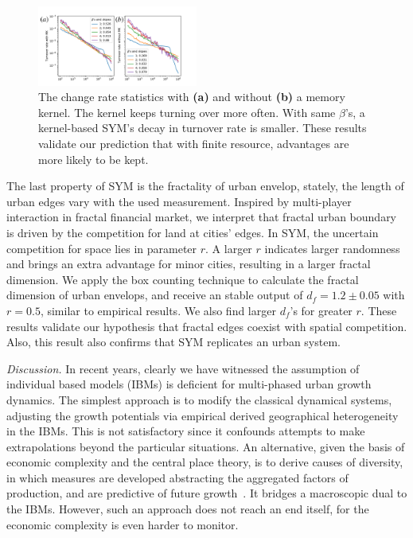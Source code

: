 \documentclass[reprint,unsortedaddress,amsmath,amssymb,aps,prl,showkeys]{revtex4-2}
\begin{document}
\begin{figure}
	\centering
	\includegraphics[width = 0.47\textwidth]{pics/turnoverrate.pdf}
	\caption{The change rate statistics with \textbf{(a)} and without \textbf{(b)} a memory kernel. The kernel keeps turning over more often. With same $\beta$'s, a kernel-based SYM's decay in turnover rate is smaller. These results validate our prediction that with finite resource, advantages are more likely to be kept.}
	\label{changerate}
\end{figure}

The last property of SYM is the fractality of urban envelop, stately, the length of urban edges vary with the used measurement. Inspired by multi-player interaction in fractal financial market\cite{PhysRevE.65.037106}, we interpret that fractal urban boundary is driven by the competition for land at cities' edges. In SYM, the uncertain competition for space lies in parameter $r$. A larger $r$ indicates larger randomness and brings an extra advantage for minor cities, resulting in a larger fractal dimension. We apply the box counting technique to calculate the fractal dimension of urban envelops, and receive an stable output of $d_f = 1.2\pm 0.05$ with $r = 0.5$, similar to empirical results\cite{batty1992form}. We also find larger $d_f$'s for greater $r$. These results validate our hypothesis that fractal edges coexist with spatial competition. Also, this result also confirms that SYM replicates an urban system.

\textit{Discussion.} In recent years, clearly we have witnessed the assumption of individual based models (IBMs) is deficient for multi-phased urban growth dynamics. The simplest approach is to modify the classical dynamical systems, adjusting the growth potentials via empirical derived geographical heterogeneity in the IBMs. This is not satisfactory since it confounds attempts to make extrapolations beyond the particular situations. An alternative, given the basis of economic complexity and the central place theory, is to derive causes of diversity, in which measures are developed abstracting the aggregated factors of production, and are predictive of future growth~\cite{Hidalgo10570}. It bridges a macroscopic dual to the IBMs. However, such an approach does not reach an end itself, for the economic complexity is even harder to monitor. 
\end{document}
